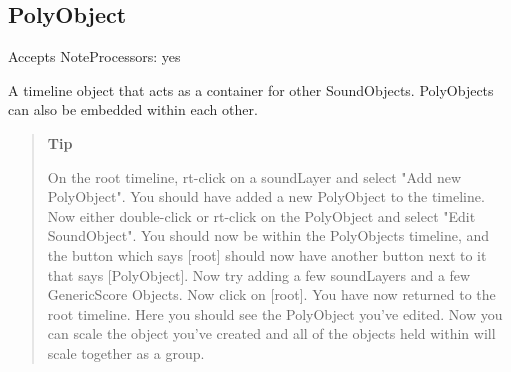 \subsection{PolyObject}\label{polyObject}

Accepts NoteProcessors: yes

A timeline object that acts as a container for other SoundObjects.
PolyObjects can also be embedded within each other.

\begin{quote}
\textbf{Tip}

On the root timeline, rt-click on a soundLayer and select "Add new
PolyObject". You should have added a new PolyObject to the timeline. Now
either double-click or rt-click on the PolyObject and select "Edit
SoundObject". You should now be within the PolyObjects timeline, and the
button which says {[}root{]} should now have another button next to it
that says {[}PolyObject{]}. Now try adding a few soundLayers and a few
GenericScore Objects. Now click on {[}root{]}. You have now returned to
the root timeline. Here you should see the PolyObject you've edited. Now
you can scale the object you've created and all of the objects held
within will scale together as a group.
\end{quote}
